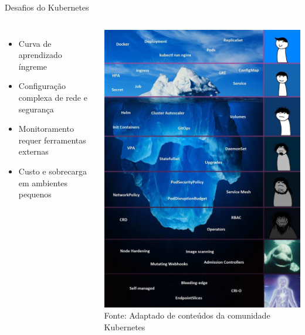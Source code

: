 \documentclass{beamer}
\begin{document}
\begin{frame}{Desafios do Kubernetes}
    \begin{columns}
        \begin{itemize}
            \item Curva de aprendizado íngreme
            \item Configuração complexa de rede e segurança
            \item Monitoramento requer ferramentas externas
            \item Custo e sobrecarga em ambientes pequenos
        \end{itemize}

        \centering
        \includegraphics[width=\textwidth]{k8s-iceberg.png}\\
        \tiny Fonte: Adaptado de conteúdos da comunidade Kubernetes
    \end{columns}
\end{frame}
\end{document}
